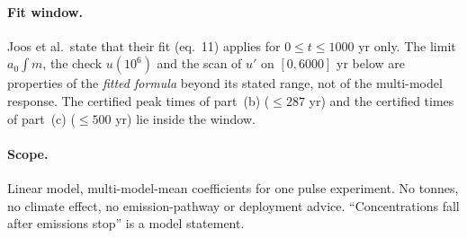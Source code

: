 \documentclass[10pt]{article}
\theoremstyle{plain}
\begin{document}
\paragraph{Fit window.} Joos et al.\ state that their fit (eq.~11) applies for $0\le t\le1000$ yr only. The limit $a_0\int m$, the check $u(10^6)$ and the scan of $u'$ on $[0,6000]$ yr below are properties of the \emph{fitted formula} beyond its stated range, not of the multi-model response. The certified peak times of part~(b) ($\le287$ yr) and the certified times of part~(c) ($\le500$ yr) lie inside the window.
\paragraph{Scope.} Linear model, multi-model-mean coefficients for one pulse experiment. No tonnes, no climate effect, no emission-pathway or deployment advice. ``Concentrations fall after emissions stop'' is a model statement.

\end{document}
